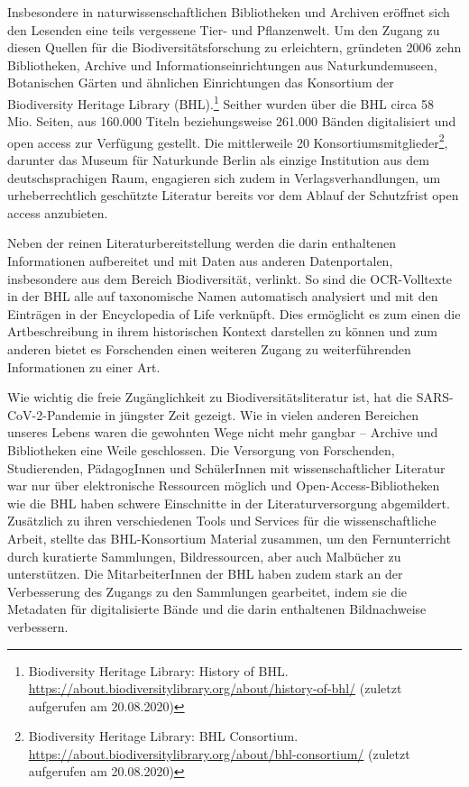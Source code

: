 \documentclass[a4paper,
fontsize=11pt,
oneside,
numbers=noperiodatend,
parskip=half-,
bibliography=totoc,
final
]{scrartcl}
\begin{document}
Insbesondere in naturwissenschaftlichen Bibliotheken und Archiven
eröffnet sich den Lesenden eine teils vergessene Tier- und Pflanzenwelt.
Um den Zugang zu diesen Quellen für die Biodiversitätsforschung zu
erleichtern, gründeten 2006 zehn Bibliotheken, Archive und
Informationseinrichtungen aus Naturkundemuseen, Botanischen Gärten und
ähnlichen Einrichtungen das Konsortium der Biodiversity Heritage Library
(BHL).\footnote{Biodiversity Heritage Library: History of BHL.
  \url{https://about.biodiversitylibrary.org/about/history-of-bhl/}
  (zuletzt aufgerufen am 20.08.2020)} Seither wurden über die BHL circa
58 Mio. Seiten, aus 160.000 Titeln beziehungsweise 261.000 Bänden
digitalisiert und open access zur Verfügung gestellt. Die mittlerweile
20 Konsortiumsmitglieder\footnote{Biodiversity Heritage Library: BHL
  Consortium.
  \url{https://about.biodiversitylibrary.org/about/bhl-consortium/}
  (zuletzt aufgerufen am 20.08.2020)}, darunter das Museum für
Naturkunde Berlin als einzige Institution aus dem deutschsprachigen
Raum, engagieren sich zudem in Verlagsverhandlungen, um urheberrechtlich
geschützte Literatur bereits vor dem Ablauf der Schutzfrist open access
anzubieten.

Neben der reinen Literaturbereitstellung werden die darin enthaltenen
Informationen aufbereitet und mit Daten aus anderen Datenportalen,
insbesondere aus dem Bereich Biodiversität, verlinkt. So sind die
OCR-Volltexte in der BHL alle auf taxonomische Namen automatisch
analysiert und mit den Einträgen in der Encyclopedia of Life verknüpft.
Dies ermöglicht es zum einen die Artbeschreibung in ihrem historischen
Kontext darstellen zu können und zum anderen bietet es Forschenden einen
weiteren Zugang zu weiterführenden Informationen zu einer Art.

Wie wichtig die freie Zugänglichkeit zu Biodiversitätsliteratur ist, hat
die SARS-CoV-2-Pandemie in jüngster Zeit gezeigt. Wie in vielen anderen
Bereichen unseres Lebens waren die gewohnten Wege nicht mehr gangbar --
Archive und Bibliotheken eine Weile geschlossen. Die Versorgung von
Forschenden, Studierenden, PädagogInnen und SchülerInnen mit
wissenschaftlicher Literatur war nur über elektronische Ressourcen
möglich und Open-Access-Bibliotheken wie die BHL haben schwere
Einschnitte in der Literaturversorgung abgemildert. Zusätzlich zu ihren
verschiedenen Tools und Services für die wissenschaftliche Arbeit,
stellte das BHL-Konsortium Material zusammen, um den Fernunterricht
durch kuratierte Sammlungen, Bildressourcen, aber auch Malbücher zu
unterstützen. Die MitarbeiterInnen der BHL haben zudem stark an der
Verbesserung des Zugangs zu den Sammlungen gearbeitet, indem sie die
Metadaten für digitalisierte Bände und die darin enthaltenen
Bildnachweise verbessern.
\end{document}

